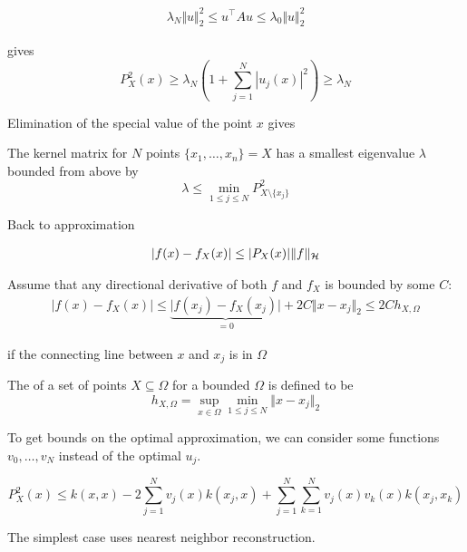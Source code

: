 \begin{align*}
    \lambda_N\Vert u\Vert_2^2\leq u^\intercal A u\leq \lambda_0\Vert u\Vert_2^2
\end{align*}

gives 
\[P_X^2(x)\geq \lambda_N\left(1+\sum_{j=1}^N |u_j(x)|^2 \right)\geq \lambda_N\]

Elimination of the special value of the point $x$ gives 

\begin{theorem}\label{thm:2.6}
    The kernel matrix for $N$ points $\{x_1,\dots,x_n\}=X$ has a smallest
    eigenvalue $\lambda$ bounded from above by \[\lambda\leq \min_{1\leq j\leq N}P_{X\setminus\{x_j\}}^2\]
\end{theorem}

Back to approximation

\begin{align*}
    \vert f(x)-f_X(x)\vert\leq\vert P_X(x)\vert \Vert f\Vert_{\mathcal{H}}
\end{align*}

Assume that any directional derivative of both $f$ and $f_X$ is bounded 
by some $C$:
\begin{align*}
    \vert f(x)-f_X(x)\vert \leq \underbrace{\vert f(x_j)-f_X(x_j)\vert}_{=0} +2C\Vert x-x_j\Vert_2\leq 2Ch_{X,\Omega} 
\end{align*}

if the connecting line between $x$ and $x_j$ is in $\Omega$ %

\begin{definition}\label{def:2.7:fill_distance}
    The  of a set of points $X\subseteq \Omega$ for a 
    bounded $\Omega$ is defined to be 
    \[h_{X,\Omega}=\sup_{x\in\Omega}\min_{1\leq j\leq N}\Vert x-x_j\Vert_2\]
\end{definition}


To get bounds on the optimal approximation, we can consider 
some functions $v_0,\dots,v_N$ instead of the optimal $u_j$.

\begin{equation}\label{eq:006}
    P_X^2(x)\leq k(x,x)-2\sum_{j=1}^N v_j(x)k(x_j,x)+\sum_{j=1}^{N}\sum_{k=1}^{N}v_j(x)v_k(x)k(x_j,x_k)
\end{equation}

The simplest case uses nearest neighbor reconstruction. 

